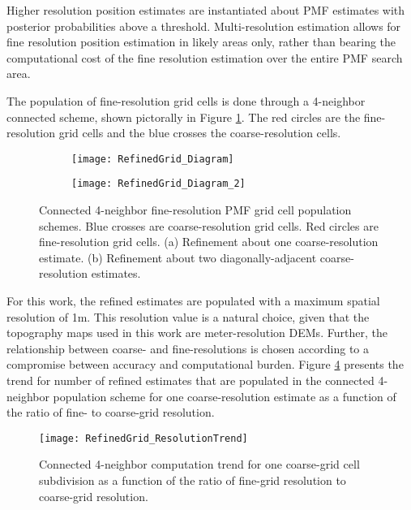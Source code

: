 Higher resolution position estimates are instantiated about PMF estimates with posterior probabilities above a threshold.
Multi-resolution estimation allows for fine resolution position estimation in likely areas only, rather than bearing the computational cost of the fine resolution estimation over the entire PMF search area.

The population of fine-resolution grid cells is done through a 4-neighbor connected scheme, shown pictorally in Figure \ref{fig:refinegrid_diagram}.  
The red circles are the fine-resolution grid cells and the blue crosses the coarse-resolution cells.

\begin{figure}[!h]
	\centering
	\begin{subfigure}[b]{0.4\textwidth}
		\texttt{[image: RefinedGrid\_Diagram]}
		\caption{}
		\label{fig:refinegrid_diagram}
	\end{subfigure}
	\hspace{8ex}
	\centering
	\begin{subfigure}[b]{0.415\textwidth}
		\texttt{[image: RefinedGrid\_Diagram\_2]}
		\caption{}
		\label{fig:resolution}
	\end{subfigure}
	\caption{Connected 4-neighbor fine-resolution PMF grid cell population schemes.  Blue crosses are coarse-resolution grid cells.  Red circles are fine-resolution grid cells. (a) Refinement about one coarse-resolution estimate. (b) Refinement about two diagonally-adjacent coarse-resolution estimates.  }	
\end{figure}

For this work, the refined estimates are populated with a maximum spatial resolution of 1m. 
This resolution value is a natural choice, given that the topography maps used in this work are meter-resolution DEMs.  
Further, the relationship between coarse- and fine-resolutions is chosen according to a compromise between accuracy and computational burden.  
Figure \ref{fig:resolutionTrend} presents the trend for number of refined estimates that are populated  in the connected 4-neighbor population scheme for one coarse-resolution estimate as a function of the ratio of fine- to coarse-grid resolution.

\begin{figure}[!h]
	\centering
	\texttt{[image: RefinedGrid\_ResolutionTrend]}
	\caption{Connected 4-neighbor computation trend for one coarse-grid cell subdivision as a function of the ratio of fine-grid resolution to coarse-grid resolution.}
	\label{fig:resolutionTrend}
\end{figure}

